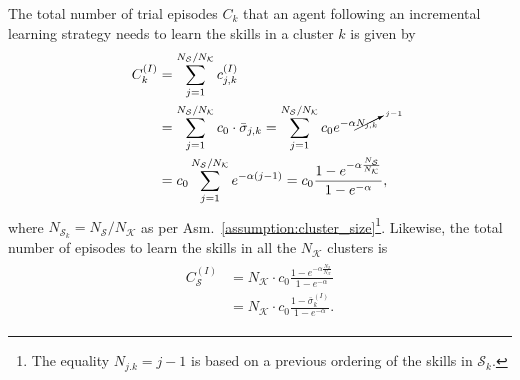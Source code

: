 The total number of trial episodes $ C_k $ that an agent following an incremental learning strategy needs to learn the skills in a cluster $ k $ is given by
\begin{align}
	\begin{split}
		C^{(I)}_k &= \sum^{N_\mathcal{S}/N_\mathcal{K}}_{j=1} c^{(I)}_{j,k}  \\
		&= \sum^{N_\mathcal{S}/N_\mathcal{K}}_{j=1} c_0 \cdot  \bar{\sigma}_{j,k}  = \sum^{N_\mathcal{S}/N_\mathcal{K}}_{j=1} c_0 e^{-\alpha {\cancelto{j-1}{N_{j,k}}}}\\
		&= c_0 \sum^{N_\mathcal{S}/N_\mathcal{K}}_{j=1} e^{-\alpha (j-1)}=c_0 \frac{1 - e^{-\alpha \frac{N_\mathcal{S}}{N_\mathcal{K}}}}{1 - e^{-\alpha}},
	\end{split}
\end{align}
where $N_{\mathcal{S}_k} = N_\mathcal{S}/N_\mathcal{K}$ as per Asm.~\ref{assumption:cluster_size}\footnote{The equality $N_{j.k} = j-1$ is based on a previous ordering of the skills in $\mathcal{S}_k$.}. Likewise, the total number of episodes to learn the skills in all the $ N_\mathcal{K} $ clusters is
%
\begin{align}\label{eq:complexity_incremental_single}
	\begin{split}
		C_\mathcal{S}^{(I)} &= N_\mathcal{K} \cdot c_0 \frac{1 - e^{-\alpha \frac{N_\mathcal{S}}{N_\mathcal{K}}}}{1 - e^{-\alpha}}\\ 
		&= N_\mathcal{K} \cdot c_0 \frac{1 - \bar{\sigma}_k^{(I)}}{1 - e^{-\alpha}}.
	\end{split}
\end{align}
